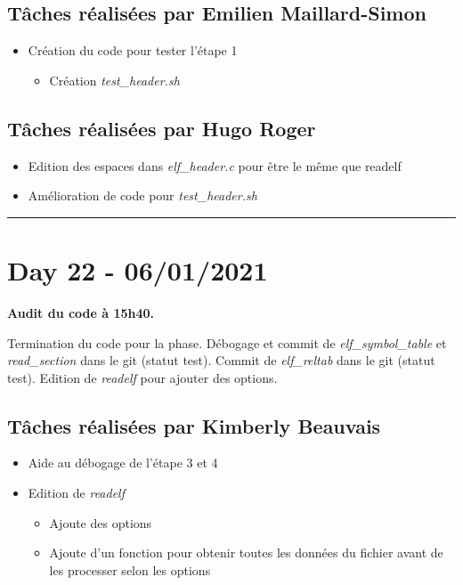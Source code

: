 \documentclass[11pt,letterpaper]{article}
\begin{document}
\subsection*{Tâches réalisées par Emilien Maillard-Simon}
\begin{itemize}
    \item Création du code pour tester l'étape 1
    \begin{itemize}
        \item Création \textit{test\_header.sh} 
    \end{itemize} 
\end{itemize}

\subsection*{Tâches réalisées par Hugo Roger}
\begin{itemize}
    \item Edition des espaces dans \textit{elf\_header.c} pour être le même que 
    readelf
    \item Amélioration de code pour \textit{test\_header.sh}
\end{itemize}

\noindent\rule{13cm}{0.4pt}

\section*{Day 22 - 06/01/2021}
\textbf{Audit du code à 15h40.}

\noindent Termination du code pour la phase.
Débogage et commit de \textit{elf\_symbol\_table} et \textit{read\_section} 
dans le git (statut test). Commit de \textit{elf\_reltab} dans le git (statut 
test). Edition de \textit{readelf} pour ajouter des options. 

\subsection*{Tâches réalisées par Kimberly Beauvais}
\begin{itemize}
    \item Aide au débogage de l'étape 3 et 4
    \item Edition de \textit{readelf}
    \begin{itemize}
        \item Ajoute des options
        \item Ajoute d'un fonction pour obtenir toutes les données du fichier avant 
        de les processer selon les options
    \end{itemize}
\end{itemize}
\end{document}
